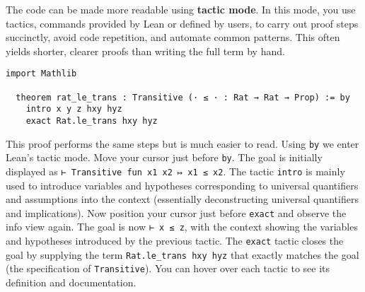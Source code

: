 \begin{example}
  The code can be made more readable using \textbf{tactic mode}.
  In this mode, you use tactics,
  commands provided by Lean or defined by users, to
  carry out proof steps succinctly, avoid code repetition,
  and automate common patterns.
  This often yields shorter, clearer proofs than writing
  the full term by hand.
  \begin{lstlisting}[language=lean]
  import Mathlib

  theorem rat_le_trans : Transitive (· ≤ · : Rat → Rat → Prop) := by
    intro x y z hxy hyz
    exact Rat.le_trans hxy hyz
\end{lstlisting}
  This proof performs the same steps but is much easier to read.
  Using \lstinline[language=lean]|by| we enter Lean's tactic mode.
  Move your cursor just before \lstinline[language=lean]|by|.
  The goal is initially displayed as \lstinline[language=lean]|⊢ Transitive fun x1 x2 ↦ x1 ≤ x2|.
  The tactic \lstinline[language=lean]|intro| is mainly used to introduce
  variables and hypotheses corresponding to universal quantifiers
  and assumptions into the context (essentially deconstructing universal quantifiers and implications).
  Now position your cursor just before \lstinline[language=lean]|exact|
  and observe the info view again.
  The goal is now \lstinline[language=lean]|⊢ x ≤ z|, with the context
  showing the variables and hypotheses introduced by the previous tactic.
  The \lstinline[language=lean]|exact| tactic closes the goal
  by supplying the term \lstinline[language=lean]|Rat.le_trans hxy hyz| that exactly matches the goal
  (the specification of \lstinline[language=lean]|Transitive|).
  You can hover over each tactic to see its definition and documentation.
\end{example}
